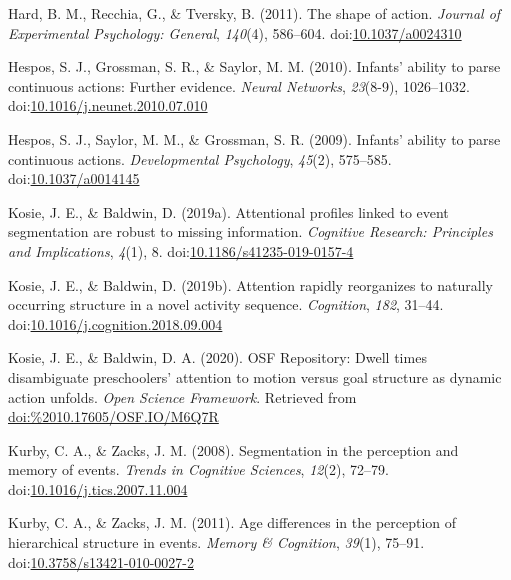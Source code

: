 \documentclass[
  english,
  man,floatsintext]{apa6}
\newlength{\cslhangindent}
\newenvironment{cslreferences}%
  {\setlength{\parindent}{0pt}%
  \everypar{\setlength{\hangindent}{\cslhangindent}}\ignorespaces}%
  {\par}
\begin{document}
\begin{cslreferences}
\leavevmode\hypertarget{ref-hard_2011}{}%
Hard, B. M., Recchia, G., \& Tversky, B. (2011). The shape of action. \emph{Journal of Experimental Psychology: General}, \emph{140}(4), 586--604. doi:\href{https://doi.org/10.1037/a0024310}{10.1037/a0024310}

\leavevmode\hypertarget{ref-hespos_2010}{}%
Hespos, S. J., Grossman, S. R., \& Saylor, M. M. (2010). Infants' ability to parse continuous actions: Further evidence. \emph{Neural Networks}, \emph{23}(8-9), 1026--1032. doi:\href{https://doi.org/10.1016/j.neunet.2010.07.010}{10.1016/j.neunet.2010.07.010}

\leavevmode\hypertarget{ref-hespos_2009}{}%
Hespos, S. J., Saylor, M. M., \& Grossman, S. R. (2009). Infants' ability to parse continuous actions. \emph{Developmental Psychology}, \emph{45}(2), 575--585. doi:\href{https://doi.org/10.1037/a0014145}{10.1037/a0014145}

\leavevmode\hypertarget{ref-kosie_baldwin_2019b}{}%
Kosie, J. E., \& Baldwin, D. (2019a). Attentional profiles linked to event segmentation are robust to missing information. \emph{Cognitive Research: Principles and Implications}, \emph{4}(1), 8. doi:\href{https://doi.org/10.1186/s41235-019-0157-4}{10.1186/s41235-019-0157-4}

\leavevmode\hypertarget{ref-kosie_baldwin_2019a}{}%
Kosie, J. E., \& Baldwin, D. (2019b). Attention rapidly reorganizes to naturally occurring structure in a novel activity sequence. \emph{Cognition}, \emph{182}, 31--44. doi:\href{https://doi.org/10.1016/j.cognition.2018.09.004}{10.1016/j.cognition.2018.09.004}

\leavevmode\hypertarget{ref-kosie_baldwin_OSF}{}%
Kosie, J. E., \& Baldwin, D. A. (2020). OSF Repository: Dwell times disambiguate preschoolers' attention to motion versus goal structure as dynamic action unfolds. \emph{Open Science Framework}. Retrieved from \url{doi:\%2010.17605/OSF.IO/M6Q7R}

\leavevmode\hypertarget{ref-kurby_zacks_2008}{}%
Kurby, C. A., \& Zacks, J. M. (2008). Segmentation in the perception and memory of events. \emph{Trends in Cognitive Sciences}, \emph{12}(2), 72--79. doi:\href{https://doi.org/10.1016/j.tics.2007.11.004}{10.1016/j.tics.2007.11.004}

\leavevmode\hypertarget{ref-kurby_zacks_2011}{}%
Kurby, C. A., \& Zacks, J. M. (2011). Age differences in the perception of hierarchical structure in events. \emph{Memory \& Cognition}, \emph{39}(1), 75--91. doi:\href{https://doi.org/10.3758/s13421-010-0027-2}{10.3758/s13421-010-0027-2}


\end{cslreferences}
\end{document}
